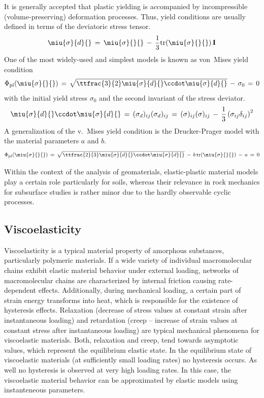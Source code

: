 It is generally accepted that plastic yielding is accompanied by incompressible (volume-preserving) deformation processes. Thus, yield
conditions are usually defined in terms of the deviatoric stress tensor.
\begin{equation}
\miu{\sigma}{d}{}\,=\,\miu{\sigma}{}{}\,-\,\frac{1}{3}\mathrm{tr}(\miu{\sigma}{}{})\,\mathbf{I}
\label{eq:devstress}
\end{equation}
One of the most widely-used and simplest models is known as von~Mises yield condition
\begin{equation}
\Phi_{\mathrm{pl}}(\miu{\sigma}{}{})\,=\,
\sqrt{\ttfrac{3}{2}\miu{\sigma}{d}{}\ccdot\miu{\sigma}{d}{}}\,-\,\sigma_0\,=\,0
\label{eq:mises}
\end{equation}
with the initial yield stress $\sigma_0$ and the second invariant of the stress deviator.
\begin{equation}
\miu{\sigma}{d}{}\ccdot\miu{\sigma}{d}{}\,=\,
(\sigma_d){}_{ij}(\sigma_d){}_{ij}\,=\,(\sigma){}_{ij}(\sigma){}_{ij}\,-\,
\frac{1}{3}\left(\sigma_{ij}\delta_{ij}\right)^2
\end{equation}
A generalization of the v.~Mises yield condition is the Drucker-Prager model
with the material parameters $a$ and $b$.
\begin{equation}
\Phi_{\mathrm{pl}}(\miu{\sigma}{}{})\,=\,
\sqrt{\ttfrac{2}{3}\miu{\sigma}{d}{}\ccdot\miu{\sigma}{d}{}}\,-\,b\,\mathrm{tr}(\miu{\sigma}{}{})\,-\,a\,=\,0
\label{eq:drucker_prager}
\end{equation}

Within the context of the analysis of geomaterials, elastic-plastic material models play a certain role particularly for soils, whereas
their relevance in rock mechanics for subsurface studies is rather minor due to the hardly observable cyclic processes.

\subsection{Viscoelasticity}
\label{sec:viscoelast}

Viscoelasticity is a typical material property of amorphous substances, particularly polymeric materials. If a wide variety of individual
macromolecular chains exhibit elastic material behavior under external loading, networks of macromolecular chains are characterized by
internal friction causing rate-dependent effects. Additionally, during mechanical loading, a certain part of strain energy transforms into
heat, which is responsible for the existence of hysteresis effects. Relaxation (decrease of stress values at constant strain after
instantaneous loading) and retardation (creep -- increase of strain values at constant stress after instantaneous loading) are typical
mechanical phenomena for viscoelastic materials. Both, relaxation and creep, tend towards asymptotic values, which represent the
equilibrium elastic state. In the equilibrium state of viscoelastic materials (at sufficiently small loading rates) no hysteresis occurs.
As well no hysteresis is observed at very high loading rates. In this case, the viscoelastic material behavior can be approximated by
elastic models using instanteneous parameters.

